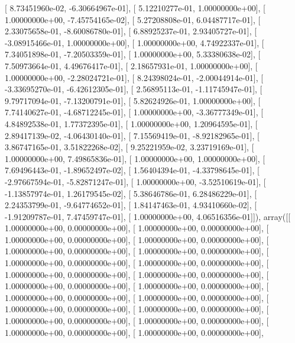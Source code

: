 \documentclass{article}
\begin{document}
       [  8.73451960e-02,  -6.30664967e-01],
       [  5.12210277e-01,   1.00000000e+00],
       [  1.00000000e+00,  -7.45754165e-02],
       [  5.27208808e-01,   6.04487717e-01],
       [  2.33075658e-01,  -8.60086780e-01],
       [  6.88925237e-01,   2.93405727e-01],
       [ -3.08915466e-01,   1.00000000e+00],
       [  1.00000000e+00,   4.74922337e-01],
       [  7.34051898e-01,  -7.20503359e-01],
       [  1.00000000e+00,   5.33380638e-02],
       [  7.50973664e-01,   4.49676417e-01],
       [  2.18657931e-01,   1.00000000e+00],
       [  1.00000000e+00,  -2.28024721e-01],
       [  8.24398024e-01,  -2.00044914e-01],
       [ -3.33695270e-01,  -6.42612305e-01],
       [  2.56895113e-01,  -1.11745947e-01],
       [  9.79717094e-01,  -7.13200791e-01],
       [  5.82624926e-01,   1.00000000e+00],
       [  7.74140627e-01,  -4.68712245e-01],
       [  1.00000000e+00,  -3.36777349e-01],
       [  4.84892538e-01,   1.77372395e-01],
       [  1.00000000e+00,   1.20964595e-01],
       [  2.89417139e-02,  -4.06430140e-01],
       [  7.15569419e-01,  -8.92182965e-01],
       [  3.86747165e-01,   3.51822268e-02],
       [  9.25221959e-02,   3.23719169e-01],
       [  1.00000000e+00,   7.49865836e-01],
       [  1.00000000e+00,   1.00000000e+00],
       [  7.69496443e-01,  -1.89652497e-02],
       [  1.56404394e-01,  -4.33798645e-01],
       [ -2.97667594e-01,  -5.82871247e-01],
       [  1.00000000e+00,  -3.52510619e-01],
       [ -1.13857974e-01,   1.26179545e-02],
       [  5.38646786e-01,   6.28486229e-01],
       [  2.24353799e-01,  -9.64774652e-01],
       [  1.84147463e-01,   4.93410660e-02],
       [ -1.91209787e-01,   7.47459747e-01],
       [  1.00000000e+00,   4.06516356e-01]]), array([[  1.00000000e+00,   0.00000000e+00],
       [  1.00000000e+00,   0.00000000e+00],
       [  1.00000000e+00,   0.00000000e+00],
       [  1.00000000e+00,   0.00000000e+00],
       [  1.00000000e+00,   0.00000000e+00],
       [  1.00000000e+00,   0.00000000e+00],
       [  1.00000000e+00,   0.00000000e+00],
       [  1.00000000e+00,   0.00000000e+00],
       [  1.00000000e+00,   0.00000000e+00],
       [  1.00000000e+00,   0.00000000e+00],
       [  1.00000000e+00,   0.00000000e+00],
       [  1.00000000e+00,   0.00000000e+00],
       [  1.00000000e+00,   0.00000000e+00],
       [  1.00000000e+00,   0.00000000e+00],
       [  1.00000000e+00,   0.00000000e+00],
       [  1.00000000e+00,   0.00000000e+00],
       [  1.00000000e+00,   0.00000000e+00],
       [  1.00000000e+00,   0.00000000e+00],
       [  1.00000000e+00,   0.00000000e+00],
       [  1.00000000e+00,   0.00000000e+00],
\end{document}
